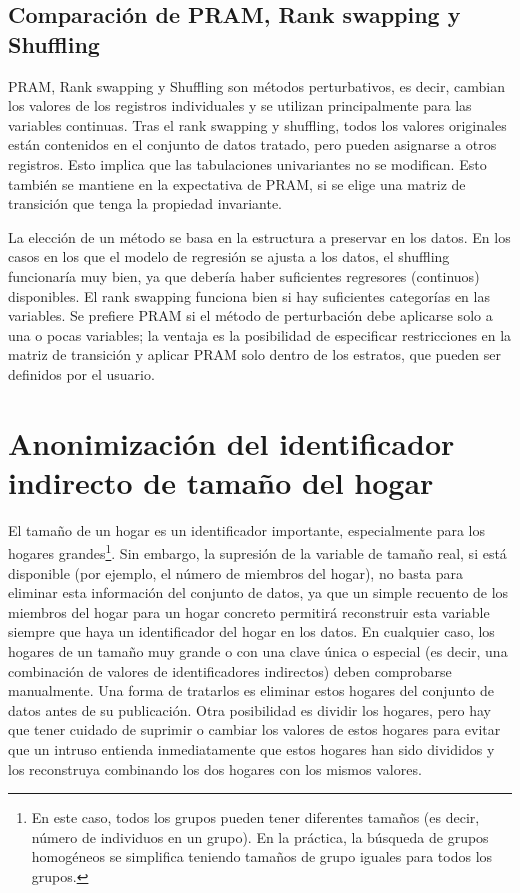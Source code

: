 \documentclass[]{book}
\theoremstyle{definition}
\theoremstyle{definition}
\theoremstyle{definition}
\theoremstyle{definition}
\theoremstyle{remark}
\begin{document}
\hypertarget{comparaciuxf3n-de-pram-rank-swapping-y-shuffling}{%
\subsection{Comparación de PRAM, Rank swapping y Shuffling}\label{comparaciuxf3n-de-pram-rank-swapping-y-shuffling}}

PRAM, Rank swapping y Shuffling son métodos perturbativos, es decir, cambian los valores de los registros individuales y se utilizan principalmente para las variables continuas. Tras el rank swapping y shuffling, todos los valores originales están contenidos en el conjunto de datos tratado, pero pueden asignarse a otros registros. Esto implica que las tabulaciones univariantes no se modifican. Esto también se mantiene en la expectativa de PRAM, si se elige una matriz de transición que tenga la propiedad invariante.

La elección de un método se basa en la estructura a preservar en los datos. En los casos en los que el modelo de regresión se ajusta a los datos, el shuffling funcionaría muy bien, ya que debería haber suficientes regresores (continuos) disponibles. El rank swapping funciona bien si hay suficientes categorías en las variables. Se prefiere PRAM si el método de perturbación debe aplicarse solo a una o pocas variables; la ventaja es la posibilidad de especificar restricciones en la matriz de transición y aplicar PRAM solo dentro de los estratos, que pueden ser definidos por el usuario.

\hypertarget{anonimizaciuxf3n-del-identificador-indirecto-de-tamauxf1o-del-hogar}{%
\section{Anonimización del identificador indirecto de tamaño del hogar}\label{anonimizaciuxf3n-del-identificador-indirecto-de-tamauxf1o-del-hogar}}

El tamaño de un hogar es un identificador importante, especialmente para los hogares grandes\footnote{En este caso, todos los grupos pueden tener diferentes tamaños (es decir, número de individuos en un grupo). En la práctica, la búsqueda de grupos homogéneos se simplifica teniendo tamaños de grupo iguales para todos los grupos.}. Sin embargo, la supresión de la variable de tamaño real, si está disponible (por ejemplo, el número de miembros del hogar), no basta para eliminar esta información del conjunto de datos, ya que un simple recuento de los miembros del hogar para un hogar concreto permitirá reconstruir esta variable siempre que haya un identificador del hogar en los datos. En cualquier caso, los hogares de un tamaño muy grande o con una clave única o especial (es decir, una combinación de valores de identificadores indirectos) deben comprobarse manualmente. Una forma de tratarlos es eliminar estos hogares del conjunto de datos antes de su publicación. Otra posibilidad es dividir los hogares, pero hay que tener cuidado de suprimir o cambiar los valores de estos hogares para evitar que un intruso entienda inmediatamente que estos hogares han sido divididos y los reconstruya combinando los dos hogares con los mismos valores.
\end{document}
